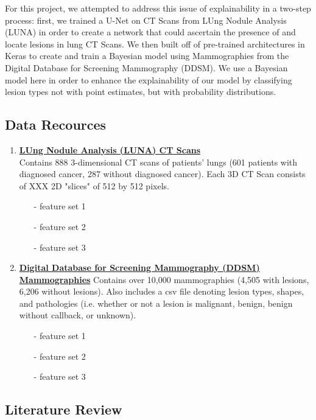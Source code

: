 \documentclass[12pt]{article}
\begin{document}
{For this project, we attempted to address this issue of explainability in a two-step process: first, we trained a U-Net on CT Scans from LUng Nodule Analysis (LUNA) in order to create a network that could ascertain the presence of and locate lesions in lung CT Scans. We then built off of pre-trained architectures in Keras to create and train a Bayesian model using Mammographies from the Digital Database for Screening Mammography (DDSM). We use a Bayesian model here in order to enhance the explainability of our model by classifying lesion types not with point estimates, but with probability distributions. 

\subsection*{Data Recources}

\begin{enumerate}
\item \textbf{\href{https://wiki.cancerimagingarchive.net/display/Public/LIDC-IDRI}{LUng Nodule Analysis (LUNA) CT Scans}}\\
Contains 888 3-dimensional CT scans of patients’ lungs (601 patients with diagnosed cancer, 287 without diagnosed cancer). Each 3D CT Scan consists of XXX 2D "slices" of 512 by 512 pixels.

\begin{itemize}
\item[-] feature set 1
\item[-] feature set 2
\item[-] feature set 3
\end{itemize}

\item \textbf{\href{https://www.ncbi.nlm.nih.gov/pmc/articles/PMC3041807}{Digital Database for Screening Mammography (DDSM) Mammographies}}
Contains over 10,000 mammographies (4,505 with lesions, 6,206 without lesions). Also includes a csv file denoting lesion types, shapes, and pathologies (i.e. whether or not a lesion is malignant, benign, benign without callback, or unknown). 

\begin{itemize}
\item[-] feature set 1
\item[-] feature set 2
\item[-] feature set 3
\end{itemize}
\end{enumerate}

\subsection*{Literature Review}

}
\end{document}
